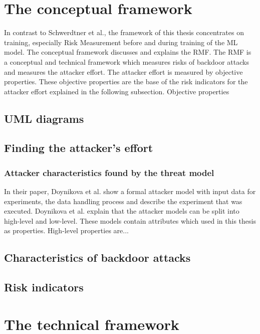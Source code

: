 \section{The conceptual framework}
\label{sec:conFrame}

In contrast to Schwerdtner et al., the framework of this thesis concentrates on training, especially Risk Measurement before and during training of the ML model.
The conceptual framework discusses and explains the RMF. The RMF is a conceptual and technical framework which measures risks of backdoor attacks and measures the attacker effort. The attacker effort
is measured by objective properties. These objective properties are the base of the risk indicators for the attacker effort explained in the following subsection. Objective properties

\subsection{UML diagrams}


\subsection{Finding the attacker's effort}

\subsubsection*{Attacker characteristics found by the threat model}

In their paper, Doynikova et al. \cite{DBLP:conf/crisis/DoynikovaNGK20} show a formal attacker model with input data for experiments, the data handling process and describe the experiment that was executed. Doynikova et al. explain that the attacker models can be split into high-level and low-level. These models contain attributes which used in this thesis as properties. High-level properties are...

\subsection{Characteristics of backdoor attacks}

\subsection{Risk indicators}
\label{sec:risk_indicators}

\newpage

\section{The technical framework}
\label{sec:techFrame}

